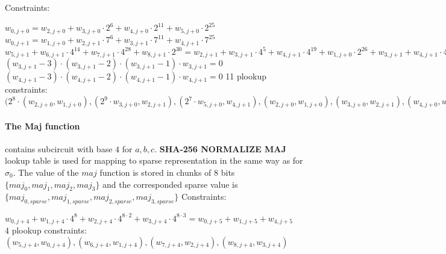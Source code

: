 Constraints:
\begin{center}
    $w_{0, j + 0} = w_{2, j + 0} + w_{3, j + 0} \cdot 2^{6} + w_{4, j + 0} \cdot 2^{11} + w_{5, j + 0} \cdot 2^{25}$ \\
    $w_{0, j + 1} = w_{1, j + 0} + w_{2, j + 1} \cdot 7^{6} + w_{3, j + 1} \cdot 7^{11} + w_{4, j + 1} \cdot 7^{25}$ \\
    $w_{5, j + 1} + w_{6, j + 1} \cdot 4^{14} + w_{7, j + 1} \cdot 4^{28} + w_{8, j + 1} \cdot 2^{30} = w_{2, j + 1} + w_{3, j + 1} \cdot 4^{5} + w_{4, j + 1} \cdot 4^{19} + w_{1, j + 0} \cdot 2^{26} + w_{3, j + 1} + w_{4, j + 1} \cdot 4^{14} + w_{1, j + 0} \cdot 4^{21} + w_{2, j + 1} \cdot 4^{27} + w_{4, j + 1} + w_{1, j + 0} \cdot 4^{7}+ w_{2, j + 1} \cdot 4^{13} + w_{3, j + 1} \cdot 4^{27}$ \\
    $(w_{3, j + 1} - 3) \cdot (w_{3, j + 1} - 2) \cdot (w_{3, j + 1} - 1) \cdot w_{3, j + 1} = 0$
    $(w_{4, j + 1} - 3) \cdot (w_{4, j + 1} - 2) \cdot (w_{4, j + 1} - 1) \cdot w_{4, j + 1} = 0$
    11 plookup constraints: $(2^8 \cdot (w_{2, j + 0}, w_{1, j + 0}), (2^9 \cdot w_{3, j + 0}, w_{2, j + 1}), (2^7 \cdot w_{5, j + 0}, w_{4, j + 1}), (w_{2,j + 0}, w_{1,j+0}), (w_{3, j + 0}, w_{2, j + 1}), (w_{4, j + 0}, w_{3, j + 1}), (w_{5, j + 0}, w_{4, j + 1}), (w_{5, j + 2}, w_{5, j + 1}), (w_{6, j + 2}, w_{6, j + 1}), (w_{7, j + 2}, w_{6, j + 1}), (w_{8, j + 2}, w_{7, j + 1})$ \\
\end{center}

\paragraph{The Maj function}
contains subcircuit with base $4$ for $a, b ,c$.
\textbf{SHA-256 NORMALIZE MAJ} lookup table is used for mapping to sparse representation in the same way as for $\sigma_0$.
The value of the $ maj $ function is stored in chunks of $8$ bits $\{maj_0, maj_1, maj_2, maj_3 \}$ and the corresponded sparse value is $\{maj_{0, sparse}, maj_{1, sparse}, maj_{2, sparse}, maj_{3, sparse} \}$
Constraints:
\begin{center}
    $w_{0, j + 4} + w_{1, j + 4} \cdot 4^8 + w_{2, j + 4} \cdot 4^{8 \cdot 2} + w_{3, j + 4} \cdot 4^{8 \cdot 3} = w_{0, j + 5} + w_{1, j + 5} + w_{4, j + 5} $ \\
    4 plookup constraints: $( w_{5, j + 4}, w_{0, j + 4}), ( w_{6, j + 4}, w_{1, j + 4}), (w_{7, j + 4}, w_{2, j + 4}), (w_{8, j + 4}, w_{3, j + 4})$ \\
\end{center}

